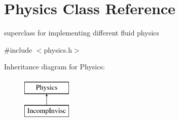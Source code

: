 \hypertarget{classPhysics}{\section{\-Physics \-Class \-Reference}
\label{classPhysics}
}


superclass for implementing different fluid physics  




{\ttfamily \#include $<$physics.\-h$>$}

\-Inheritance diagram for \-Physics\-:\begin{figure}[H]
\begin{center}
\leavevmode
\includegraphics[height=2.000000cm]{classPhysics}
\end{center}
\end{figure}
